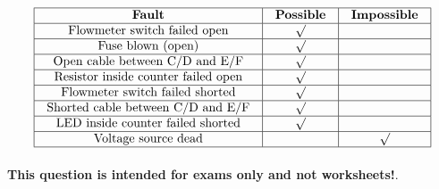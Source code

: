 






$$\vbox{\offinterlineskip
\halign{\strut
\vrule \quad\hfil # \ \hfil & 
\vrule \quad\hfil # \ \hfil & 
\vrule \quad\hfil # \ \hfil \vrule \cr
\noalign{\hrule}
%
{\bf Fault} & {\bf Possible} & {\bf Impossible} \cr
%
\noalign{\hrule}
%
Flowmeter switch failed open & $\surd$ &  \cr
%
\noalign{\hrule}
%
Fuse blown (open) & $\surd$ &  \cr
%
\noalign{\hrule}
%
Open cable between C/D and E/F & $\surd$ &  \cr
%
\noalign{\hrule}
%
Resistor inside counter failed open & $\surd$ &  \cr
%
\noalign{\hrule}
%
Flowmeter switch failed shorted & $\surd$ &  \cr
%
\noalign{\hrule}
%
Shorted cable between C/D and E/F & $\surd$ &  \cr
%
\noalign{\hrule}
%
LED inside counter failed shorted & $\surd$ &  \cr
%
\noalign{\hrule}
%
Voltage source dead &  & $\surd$ \cr
%
\noalign{\hrule}
} %
}$$ %








{\bf This question is intended for exams only and not worksheets!}.


